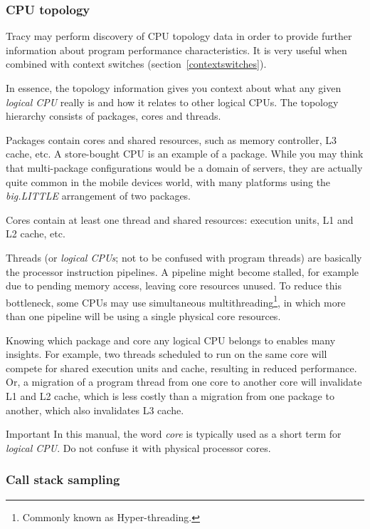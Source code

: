 \documentclass[hidelinks,titlepage,a4paper]{article}
\begin{document}
\subsubsection{CPU topology}
\label{cputopology}

Tracy may perform discovery of CPU topology data in order to provide further information about program performance characteristics. It is very useful when combined with context switches (section~\ref{contextswitches}).

In essence, the topology information gives you context about what any given \emph{logical CPU} really is and how it relates to other logical CPUs. The topology hierarchy consists of packages, cores and threads.

Packages contain cores and shared resources, such as memory controller, L3 cache, etc. A store-bought CPU is an example of a package. While you may think that multi-package configurations would be a domain of servers, they are actually quite common in the mobile devices world, with many platforms using the \emph{big.LITTLE} arrangement of two packages.

Cores contain at least one thread and shared resources: execution units, L1 and L2 cache, etc.

Threads (or \emph{logical CPUs}; not to be confused with program threads) are basically the processor instruction pipelines. A pipeline might become stalled, for example due to pending memory access, leaving core resources unused. To reduce this bottleneck, some CPUs may use simultaneous multithreading\footnote{Commonly known as Hyper-threading.}, in which more than one pipeline will be using a single physical core resources.

Knowing which package and core any logical CPU belongs to enables many insights. For example, two threads scheduled to run on the same core will compete for shared execution units and cache, resulting in reduced performance. Or, a migration of a program thread from one core to another core will invalidate L1 and L2 cache, which is less costly than a migration from one package to another, which also invalidates L3 cache.

\begin{bclogo}[
noborder=true,
couleur=black!5,
logo=\bcbombe
]{Important}
In this manual, the word \emph{core} is typically used as a short term for \emph{logical CPU}. Do not confuse it with physical processor cores.
\end{bclogo}

\subsubsection{Call stack sampling}
\label{sampling}
\end{document}
